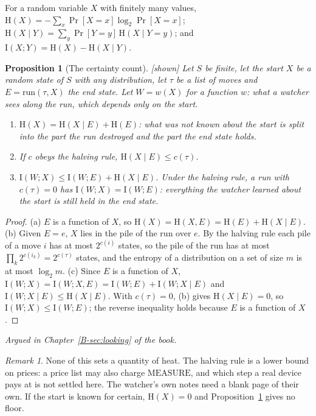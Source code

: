 \documentclass[11pt, a4paper]{article}
\theoremstyle{plain}
\newtheorem{proposition}[theorem]{Proposition}
\theoremstyle{definition}
\theoremstyle{remark}
\newtheorem{remark}[theorem]{Remark}
\newcommand{\cost}{c}
\newcommand{\run}{\mathrm{run}}
\newcommand{\argued}[1]{\par\noindent\textit{Argued in Chapter~\ref{B-#1} of the book.}\par}
\newcommand{\kind}[1]{\textup{[#1]}}
\begin{document}
For a random variable $X$ with finitely many values, $\mathrm{H}(X)=-\sum_x \Pr[X=x]\log_2\Pr[X=x]$;
$\mathrm{H}(X\mid Y)=\sum_y\Pr[Y=y]\,\mathrm{H}(X\mid Y=y)$; and $\mathrm{I}(X;Y)=\mathrm{H}(X)-\mathrm{H}(X\mid Y)$.

\begin{proposition}[The certainty count]\label{spec:certainty} \kind{shown}
Let $S$ be finite, let the start $X$ be a random state of $S$ with any distribution, let $\tau$ be a list of
moves and $E=\run(\tau,X)$ the end state. Let $W=w(X)$ for a function $w$: what a watcher sees along the
run, which depends only on the start.
\begin{enumerate}[label=(\alph*)]
\item $\mathrm{H}(X)=\mathrm{H}(X\mid E)+\mathrm{H}(E)$: what was not known about the start is split into the
part the run destroyed and the part the end state holds.
\item If $\cost$ obeys the halving rule, $\mathrm{H}(X\mid E)\le\cost(\tau)$.
\item $\mathrm{I}(W;X)\le\mathrm{I}(W;E)+\mathrm{H}(X\mid E)$. Under the halving rule, a run with
$\cost(\tau)=0$ has $\mathrm{I}(W;X)=\mathrm{I}(W;E)$: everything the watcher learned about the start is
still held in the end state.
\end{enumerate}
\end{proposition}
\begin{proof}
(a) $E$ is a function of $X$, so $\mathrm{H}(X)=\mathrm{H}(X,E)=\mathrm{H}(E)+\mathrm{H}(X\mid E)$.
(b) Given $E=e$, $X$ lies in the pile of the run over $e$. By the halving rule each pile of a move $i$ has at
most $2^{\cost(i)}$ states, so the pile of the run has at most $\prod_k 2^{\cost(i_k)}=2^{\cost(\tau)}$
states, and the entropy of a distribution on a set of size $m$ is at most $\log_2 m$.
(c) Since $E$ is a function of $X$, $\mathrm{I}(W;X)=\mathrm{I}(W;X,E)=\mathrm{I}(W;E)+\mathrm{I}(W;X\mid E)$ and
$\mathrm{I}(W;X\mid E)\le\mathrm{H}(X\mid E)$. With $\cost(\tau)=0$, (b) gives $\mathrm{H}(X\mid E)=0$, so
$\mathrm{I}(W;X)\le\mathrm{I}(W;E)$; the reverse inequality holds because $E$ is a function of $X$.
\end{proof}
\argued{sec:looking}

\begin{remark}\label{spec:looking-scope}
None of this sets a quantity of heat. The halving rule is a lower bound on prices: a price list may also
charge $\mathrm{MEASURE}$, and which step a real device pays at is not settled here. The watcher's own
notes need a blank page of their own. If the start is known for certain, $\mathrm{H}(X)=0$ and
Proposition~\ref{spec:certainty} gives no floor.
\end{remark}
\end{document}

